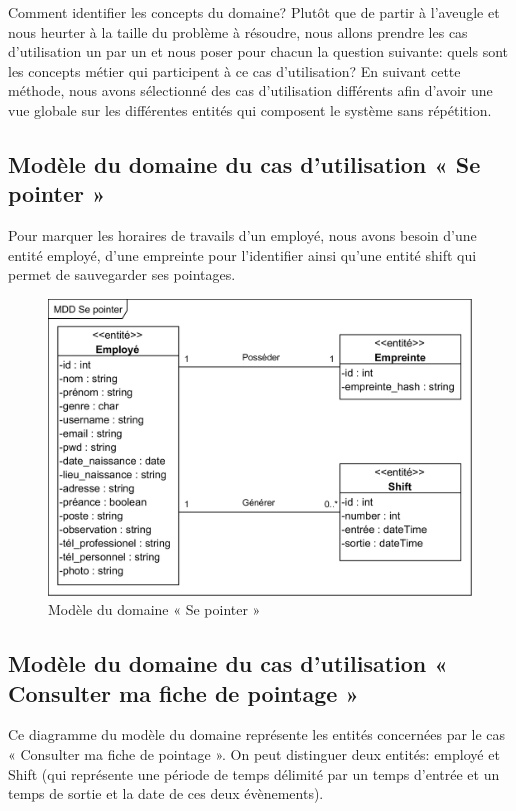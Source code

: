 Comment identifier les concepts du domaine? Plutôt que de partir à l’aveugle 
et nous heurter à la taille du problème à résoudre, nous allons prendre les cas 
d’utilisation un par un et nous poser pour chacun la question suivante: quels 
sont les concepts métier qui participent à ce cas d’utilisation? En suivant 
cette méthode, nous avons sélectionné des cas d’utilisation différents afin 
d’avoir une vue globale sur les différentes entités qui composent le système 
sans répétition.

\subsection*{Modèle du domaine du cas d'utilisation « Se pointer »}
Pour marquer les horaires de travails d’un employé, nous avons besoin d’une 
entité employé, d'une empreinte pour l’identifier ainsi qu’une entité shift qui 
permet de sauvegarder ses pointages. 

\begin{figure}[h!]
    \centering
    \includegraphics[scale=1.3]{images/MDD/MDD Se pointer.png}
    \caption{Modèle du domaine « Se pointer »}
    \label{fig12}
\end{figure}


\subsection*{Modèle du domaine du cas d'utilisation « Consulter ma fiche de pointage »}
Ce diagramme du modèle du domaine représente les entités concernées par le cas 
« Consulter ma fiche de pointage ». On peut distinguer deux entités: employé 
et Shift (qui représente une période de temps délimité par un temps d’entrée et 
un temps de sortie et la date de ces deux évènements).

